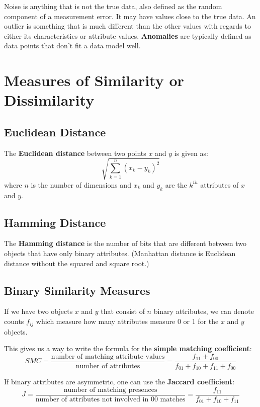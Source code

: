 \documentclass[12pt]{amsart}
\begin{document}
Noise is anything that is not the true data, also defined as the random component of a measurement error. It may have values close to the true data. An outlier is something that is much different than the other values with regards to either its characteristics or attribute values. \textbf{Anomalies} are typically defined as data points that don't fit a data model well.

\section{Measures of Similarity or Dissimilarity}

\subsection{Euclidean Distance}
The \textbf{Euclidean distance} between two points $x$ and $y$ is given as:
\begin{equation*}
\sqrt{ \sum_{k=1}^n (x_k - y_k)^2 }
\end{equation*}
where $n$ is the number of dimensions and $x_k$ and $y_k$ are the $k^{th}$ attributes of $x$ and $y$.

\subsection{Hamming Distance}
The \textbf{Hamming distance} is the number of bits that are different between two objects that have only binary attributes. (Manhattan distance is Euclidean distance without the squared and square root.)

\subsection{Binary Similarity Measures}
If we have two objects $x$ and $y$ that consist of $n$ binary attributes, we can denote counts $f_{ij}$ which measure how many attributes measure 0 or 1 for the $x$ and $y$ objects. 

This gives us a way to write the formula for the \textbf{simple matching coefficient}:
\begin{equation*}
SMC = \frac{\text{number of matching attribute values}}{\text{number of attributes}} = \frac{f_{11} + f_{00}}{f_{01} + f_{10} + f_{11} + f_{00}}
\end{equation*}


If binary attributes are asymmetric, one can use the \textbf{Jaccard coefficient}:
\begin{equation*}
J = \frac{\text{number of matching presences}}{\text{number of attributes not involved in 00 matches}} = \frac{f_{11}}{f_{01} + f_{10} + f_{11}}
\end{equation*}
\end{document}
